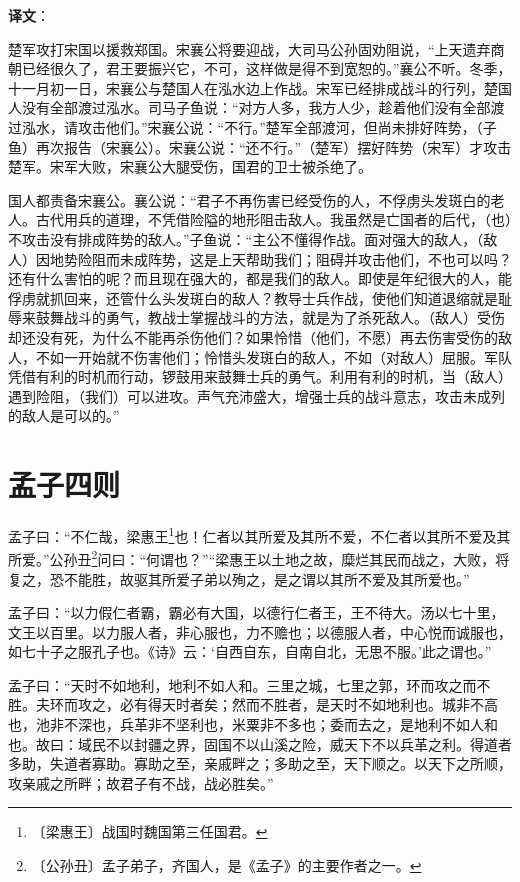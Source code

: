 \documentclass[12pt,UTF-8,openany]{ctexbook}
\begin{document}
\newpage

\textbf{译文}：

\vspace{1em}

\begin{normalsize}
    
    楚军攻打宋国以援救郑国。宋襄公将要迎战，大司马公孙固劝阻说，“上天遗弃商朝已经很久了，君王要振兴它，不可，这样做是得不到宽恕的。”襄公不听。冬季，十一月初一日，宋襄公与楚国人在泓水边上作战。宋军已经排成战斗的行列，楚国人没有全部渡过泓水。司马子鱼说：“对方人多，我方人少，趁着他们没有全部渡过泓水，请攻击他们。”宋襄公说：“不行。”楚军全部渡河，但尚未排好阵势，（子鱼）再次报告（宋襄公）。宋襄公说：“还不行。”（楚军）摆好阵势（宋军）才攻击楚军。宋军大败，宋襄公大腿受伤，国君的卫士被杀绝了。
    
    国人都责备宋襄公。襄公说：“君子不再伤害已经受伤的人，不俘虏头发斑白的老人。古代用兵的道理，不凭借险隘的地形阻击敌人。我虽然是亡国者的后代，（也）不攻击没有排成阵势的敌人。”子鱼说：“主公不懂得作战。面对强大的敌人，（敌人）因地势险阻而未成阵势，这是上天帮助我们；阻碍并攻击他们，不也可以吗？还有什么害怕的呢？而且现在强大的，都是我们的敌人。即使是年纪很大的人，能俘虏就抓回来，还管什么头发斑白的敌人？教导士兵作战，使他们知道退缩就是耻辱来鼓舞战斗的勇气，教战士掌握战斗的方法，就是为了杀死敌人。（敌人）受伤却还没有死，为什么不能再杀伤他们？如果怜惜（他们，不愿）再去伤害受伤的敌人，不如一开始就不伤害他们；怜惜头发斑白的敌人，不如（对敌人）屈服。军队凭借有利的时机而行动，锣鼓用来鼓舞士兵的勇气。利用有利的时机，当（敌人）遇到险阻，（我们）可以进攻。声气充沛盛大，增强士兵的战斗意志，攻击未成列的敌人是可以的。”
    
\end{normalsize}



\chapter{孟子四则}

\begin{normalsize}
    
    孟子曰：“不仁哉，梁惠王\footnote{〔梁惠王〕战国时魏国第三任国君。}也！仁者以其所爱及其所不爱，不仁者以其所不爱及其所爱。”公孙丑\footnote{〔公孙丑〕孟子弟子，齐国人，是《孟子》的主要作者之一。}问曰：“何谓也？”“梁惠王以土地之故，糜烂其民而战之，大败，将复之，恐不能胜，故驱其所爱子弟以殉之，是之谓以其所不爱及其所爱也。”
    
    孟子曰：“以力假仁者霸，霸必有大国，以德行仁者王，王不待大。汤以七十里，文王以百里。以力服人者，非心服也，力不赡也；以德服人者，中心悦而诚服也，如七十子之服孔子也。《诗》云：‘自西自东，自南自北，无思不服。’此之谓也。”
    
    孟子曰：“天时不如地利，地利不如人和。三里之城，七里之郭，环而攻之而不胜。夫环而攻之，必有得天时者矣；然而不胜者，是天时不如地利也。城非不高也，池非不深也，兵革非不坚利也，米粟非不多也；委而去之，是地利不如人和也。故曰：域民不以封疆之界，固国不以山溪之险，威天下不以兵革之利。得道者多助，失道者寡助。寡助之至，亲戚畔之；多助之至，天下顺之。以天下之所顺，攻亲戚之所畔；故君子有不战，战必胜矣。”
\end{normalsize}
\end{document}
